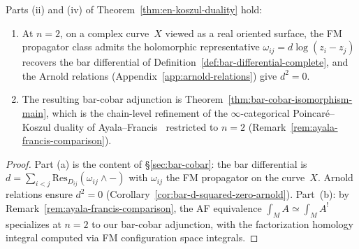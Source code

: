 \begin{proposition}[\texorpdfstring{$n = 2$}{n = 2} recovery and AF comparison;
\ClaimStatusProvedHere]\label{prop:en-n2-recovery}\label{prop:en-n1-recovery}
Parts \textup{(ii)} and \textup{(iv)} of
Theorem~\textup{\ref{thm:en-koszul-duality}} hold:
\begin{enumerate}[label=\textup{(\alph*)}]
\item At $n = 2$, on a complex curve~$X$ viewed as a real oriented
  surface, the FM propagator class admits the holomorphic
  representative $\omega_{ij} = d\log(z_i - z_j)$
  recovers the bar differential of
  Definition~\textup{\ref{def:bar-differential-complete}},
  and the Arnold relations
  \textup{(}Appendix~\textup{\ref{app:arnold-relations})} give $d^2 = 0$.
\item The resulting bar-cobar adjunction is
  Theorem~\textup{\ref{thm:bar-cobar-isomorphism-main}},
  which is the chain-level refinement of the $\infty$-categorical
  Poincar\'e--Koszul duality of Ayala--Francis~\cite{AF15}
  restricted to $n = 2$
  \textup{(}Remark~\textup{\ref{rem:ayala-francis-comparison})}.
\end{enumerate}
\end{proposition}

\begin{proof}
Part (a) is the content of \S\ref{sec:bar-cobar}: the
bar differential is $d = \sum_{i < j} \mathrm{Res}_{D_{ij}}(\omega_{ij} \wedge -)$
with $\omega_{ij}$ the FM propagator on the curve~$X$.  Arnold relations
ensure $d^2 = 0$ (Corollary~\ref{cor:bar-d-squared-zero-arnold}).  Part~(b):
by Remark~\ref{rem:ayala-francis-comparison}, the AF equivalence
$\int_M A \simeq \int_M A^!$ specializes at $n = 2$ to our
bar-cobar adjunction, with the factorization homology integral
computed via FM configuration space integrals.
\end{proof}

